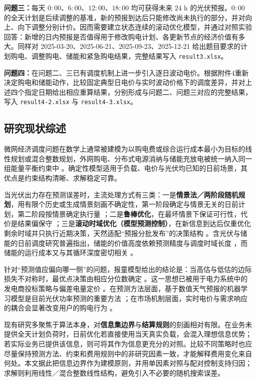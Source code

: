 \indent\textbf{问题三：}每天 $0{:}00$、$6{:}00$、$12{:}00$、$18{:}00$ 均可获得未来 $24$ h 的光伏预报。$0{:}00$ 的全天计划是后续调整的基准，新的预报到达后只能修改尚未执行的部分，并对向上、向下调整分别计价。因而需要建立状态连续的滚动优化模型，并通过对照实验回答：新增的日内预报是否值得用于修改购电计划、各更新节点的经济价值有多大。同样对 2025-03-20、2025-06-21、2025-09-23、2025-12-21 给出题目要求的计划购电、调整购电、储能和紧急购电结果，完整结果写入 \texttt{result3.xlsx}。

\indent\textbf{问题四：}在问题二、三已有调度机制上进一步引入逐日波动电价。根据附件4重新决定购电和储能动作，比较固定典型日电价与实时波动价格下的调度差异，并对上述四个指定日期给出相应重算结果，分别形成与问题二、问题三对应的完整结果，写入 \texttt{result4-2.xlsx} 与 \texttt{result4-3.xlsx}。

\subsection{研究现状综述}

微网经济调度问题在数学上通常被建模为以购电费或综合运行成本最小为目标的线性规划或混合整数规划，外网购电、分布式电源消纳与储能充放电被统一纳入同一组能量平衡约束中 \cite{wu2014dynamic,nemati2018optimization}。确定性模型适用于负载、电价与光伏均已知的日前场景，其优点是约束结构清晰、求解稳定可靠。

当光伏出力存在预测误差时，主流处理方式有三类：一是\textbf{情景法／两阶段随机规划}，用有限个历史或生成情景刻画不确定性，第一阶段确定与情景无关的日前计划，第二阶段按情景确定执行量 \cite{wu2016solution,sun2025distributionally}；二是\textbf{鲁棒优化}，在最坏情景下保证可行性，代价是结果偏保守 \cite{zhang2018robust}；三是\textbf{滚动时域优化（模型预测控制）}，在新信息到达后仅重优化剩余时域并只执行近期决策，天然适配“预报分批发布”的决策结构 \cite{elkazaz2020energy,silva2020optimal}。含光伏与储能的日前调度研究普遍指出，储能的价值高度依赖预测精度与调度时域长度 \cite{luo2020optimal}，而储能的运行成本又与其循环深度密切相关 \cite{maheshwari2020optimizing}。

针对“预测值应偏向哪一侧”的问题，报童模型给出的结论是：当高估与低估的边际损失不对称时，最优点决策由相应分位数确定 \cite{qin2011newsvendor}。这一思想已被用于电力系统中的发电商投标策略与偏差电量定价 \cite{polat2024renewable}。在预测方法层面，基于数值天气预报的机器学习模型是目前光伏功率预测的重要方法 \cite{markovics2022comparison}；在市场机制层面，实时电价与需求响应的耦合会显著改变用户的购电行为 \cite{wang2015review}。

现有研究多聚焦于算法本身，对\textbf{信息集边界}与\textbf{结算规则}的刻画相对有限。在业务未提供全天计划负荷时，日前优化若直接使用当天真实负载，会混入理想信息优势；若实际业务已提供该信息，则可将其作为信息更充分的对照。比较不同策略时也应尽量保持预测方法、约束和费用规则中的非研究因素一致，才能解释费用变化来自何处。本文据此把信息边界作为建模原则，并用单因素对照与配对控制支持归因；求解则利用线性／混合整数线性结构，避免引入不必要的随机搜索误差。
